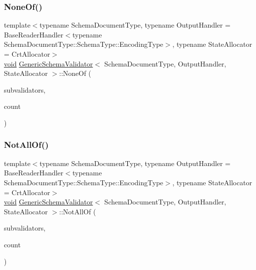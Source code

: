 \subsubsection{\texorpdfstring{None\+Of()}{NoneOf()}}
{\footnotesize\ttfamily template$<$typename Schema\+Document\+Type, typename Output\+Handler = Base\+Reader\+Handler$<$typename Schema\+Document\+Type\+::\+Schema\+Type\+::\+Encoding\+Type$>$, typename State\+Allocator = Crt\+Allocator$>$ \\
\hyperlink{imgui__impl__opengl3__loader_8h_ac668e7cffd9e2e9cfee428b9b2f34fa7}{void} \hyperlink{classGenericSchemaValidator}{Generic\+Schema\+Validator}$<$ Schema\+Document\+Type, Output\+Handler, State\+Allocator $>$\+::None\+Of (\begin{DoxyParamCaption}\item[{I\+Schema\+Validator $\ast$$\ast$}]{subvalidators,  }\item[{\hyperlink{rapidjson_8h_a5ed6e6e67250fadbd041127e6386dcb5}{Size\+Type}}]{count }\end{DoxyParamCaption})\hspace{0.3cm}{\ttfamily [inline]}}

\mbox{\label{classGenericSchemaValidator_a4275b02cdd86bfe11b42afe94817eae5}} 
\subsubsection{\texorpdfstring{Not\+All\+Of()}{NotAllOf()}}
{\footnotesize\ttfamily template$<$typename Schema\+Document\+Type, typename Output\+Handler = Base\+Reader\+Handler$<$typename Schema\+Document\+Type\+::\+Schema\+Type\+::\+Encoding\+Type$>$, typename State\+Allocator = Crt\+Allocator$>$ \\
\hyperlink{imgui__impl__opengl3__loader_8h_ac668e7cffd9e2e9cfee428b9b2f34fa7}{void} \hyperlink{classGenericSchemaValidator}{Generic\+Schema\+Validator}$<$ Schema\+Document\+Type, Output\+Handler, State\+Allocator $>$\+::Not\+All\+Of (\begin{DoxyParamCaption}\item[{I\+Schema\+Validator $\ast$$\ast$}]{subvalidators,  }\item[{\hyperlink{rapidjson_8h_a5ed6e6e67250fadbd041127e6386dcb5}{Size\+Type}}]{count }\end{DoxyParamCaption})\hspace{0.3cm}{\ttfamily [inline]}}


